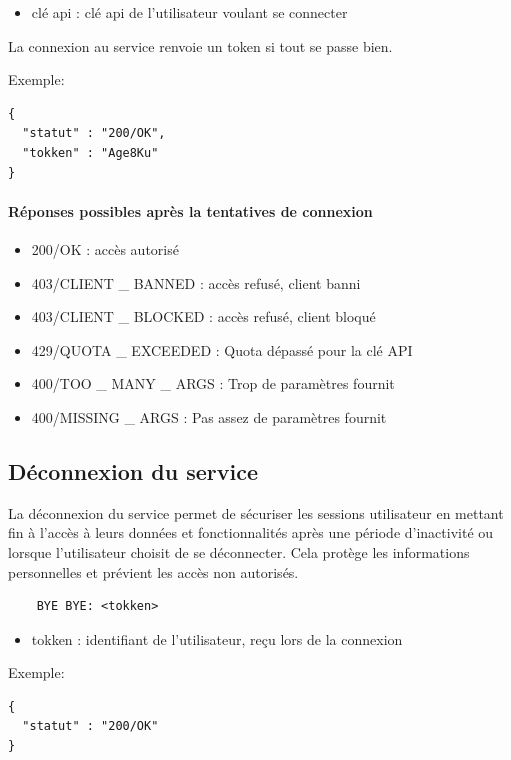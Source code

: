 \documentclass{report}
\begin{document}
\begin{itemize}
	\item clé api : clé api de l'utilisateur voulant se connecter
\end{itemize}

La connexion au service renvoie un token si tout se passe bien.

Exemple:
\begin{verbatim}
{
  "statut" : "200/OK",
  "tokken" : "Age8Ku"
}
\end{verbatim}

\paragraph{Réponses possibles après la tentatives de connexion}

\begin{itemize}
	\item 200/OK : accès autorisé
	\item 403/CLIENT \_ BANNED : accès refusé, client banni
	\item 403/CLIENT \_ BLOCKED : accès refusé, client bloqué
	\item 429/QUOTA \_ EXCEEDED : Quota dépassé pour la clé API
	\item 400/TOO \_ MANY \_ ARGS : Trop de paramètres fournit
	\item 400/MISSING \_ ARGS : Pas assez de paramètres fournit
\end{itemize}

\subsection{Déconnexion du service}

La déconnexion du service permet de sécuriser les sessions utilisateur en mettant fin à l'accès à leurs données et fonctionnalités après une période d'inactivité ou lorsque l'utilisateur choisit de se déconnecter. Cela protège les informations personnelles et prévient les accès non autorisés.

\begin{verbatim}
	BYE BYE: <tokken>
\end{verbatim}

\begin{itemize}
	\item tokken : identifiant de l'utilisateur, reçu lors de la connexion
\end{itemize}

Exemple:
\begin{verbatim}
{
  "statut" : "200/OK"
}
\end{verbatim}
\end{document}
